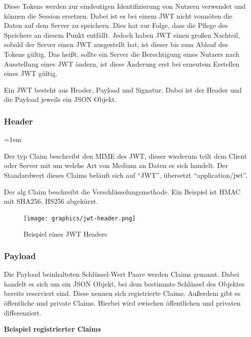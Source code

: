 Diese Tokens werden zur eindeutigen Identifizierung von Nutzern verwendet und können die Session ersetzen. Dabei ist es bei einem \gls{JWT} nicht vonnöten die Daten auf dem Server zu speichern. Dies hat zur Folge, dass die Pflege des Speichers an diesem Punkt entfällt. Jedoch haben \gls{JWT} einen großen Nachteil, sobald der Server einen \gls{JWT} ausgestellt hat, ist dieser bis zum Ablauf des Tokens gültig. Das heißt, sollte ein Server die Berechtigung eines Nutzers nach Ausstellung eines \gls{JWT} ändern, ist diese Änderung erst bei erneutem Erstellen eines \gls{JWT} gültig.

Ein \gls{JWT} besteht aus Header, Payload und Signatur. Dabei ist der Header und die Payload jeweils ein \gls{JSON} Objekt.

\subsubsection{Header}
\label{sec: jwt_header}

\begin{description}
	\leftskip=1em
	\item[typ] Der typ Claim beschreibt den \gls{MIME} des \gls{JWT}, dieser wiederum teilt dem Client oder Server mit um welche Art von Medium an Daten es sich handelt. Der Standardwert dieses Claims beläuft sich auf \enquote{JWT}, übersetzt \enquote{application/jwt}.
	\item[alg] Der alg Claim beschreibt die Verschlüsselungsmethode. Ein Beispiel ist \gls{HMAC} mit \gls{SHA256}, HS256 abgekürzt.
\end{description}

\begin{figure}[h]
	\centering
	\texttt{[image: graphics/jwt-header.png]}
	\caption{Beispiel eines \gls{JWT} Headers }
	\label{fig:jwt-header}
\end{figure}

\subsubsection{Payload}
\label{sec: jwt-payload}

Die Payload beinhalteten Schlüssel-Wert Paare werden Claims genannt. Dabei handelt es sich um ein JSON Objekt, bei dem bestimmte Schlüssel des Objektes bereits reserviert sind. Diese nennen sich registrierte Claims. Außerdem gibt es öffentliche und private Claims. Hierbei wird zwischen öffentlichen und privaten differenziert.

\noindent
\textbf{Beispiel registrierter Claims}


